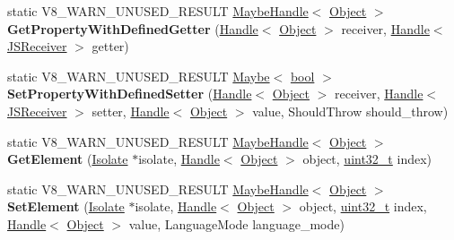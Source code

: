 \begin{DoxyCompactItemize}
\item 
\mbox{\label{classv8_1_1internal_1_1Object_a60e3ff2136485ae51459dee807c848ff}} 
static V8\+\_\+\+W\+A\+R\+N\+\_\+\+U\+N\+U\+S\+E\+D\+\_\+\+R\+E\+S\+U\+LT \mbox{\hyperlink{classv8_1_1internal_1_1MaybeHandle}{Maybe\+Handle}}$<$ \mbox{\hyperlink{classv8_1_1internal_1_1Object}{Object}} $>$ {\bfseries Get\+Property\+With\+Defined\+Getter} (\mbox{\hyperlink{classv8_1_1internal_1_1Handle}{Handle}}$<$ \mbox{\hyperlink{classv8_1_1internal_1_1Object}{Object}} $>$ receiver, \mbox{\hyperlink{classv8_1_1internal_1_1Handle}{Handle}}$<$ \mbox{\hyperlink{classv8_1_1internal_1_1JSReceiver}{J\+S\+Receiver}} $>$ getter)
\item 
\mbox{\label{classv8_1_1internal_1_1Object_a22a70157b9eac8378561666c1ecbb04e}} 
static V8\+\_\+\+W\+A\+R\+N\+\_\+\+U\+N\+U\+S\+E\+D\+\_\+\+R\+E\+S\+U\+LT \mbox{\hyperlink{classv8_1_1Maybe}{Maybe}}$<$ \mbox{\hyperlink{classbool}{bool}} $>$ {\bfseries Set\+Property\+With\+Defined\+Setter} (\mbox{\hyperlink{classv8_1_1internal_1_1Handle}{Handle}}$<$ \mbox{\hyperlink{classv8_1_1internal_1_1Object}{Object}} $>$ receiver, \mbox{\hyperlink{classv8_1_1internal_1_1Handle}{Handle}}$<$ \mbox{\hyperlink{classv8_1_1internal_1_1JSReceiver}{J\+S\+Receiver}} $>$ setter, \mbox{\hyperlink{classv8_1_1internal_1_1Handle}{Handle}}$<$ \mbox{\hyperlink{classv8_1_1internal_1_1Object}{Object}} $>$ value, Should\+Throw should\+\_\+throw)
\item 
\mbox{\label{classv8_1_1internal_1_1Object_a38d82e0f9c0c94096d6524b34844dc1a}} 
static V8\+\_\+\+W\+A\+R\+N\+\_\+\+U\+N\+U\+S\+E\+D\+\_\+\+R\+E\+S\+U\+LT \mbox{\hyperlink{classv8_1_1internal_1_1MaybeHandle}{Maybe\+Handle}}$<$ \mbox{\hyperlink{classv8_1_1internal_1_1Object}{Object}} $>$ {\bfseries Get\+Element} (\mbox{\hyperlink{classv8_1_1internal_1_1Isolate}{Isolate}} $\ast$isolate, \mbox{\hyperlink{classv8_1_1internal_1_1Handle}{Handle}}$<$ \mbox{\hyperlink{classv8_1_1internal_1_1Object}{Object}} $>$ object, \mbox{\hyperlink{classuint32__t}{uint32\+\_\+t}} index)
\item 
\mbox{\label{classv8_1_1internal_1_1Object_a23dd55843639ed7fd2aff0a62ce15e39}} 
static V8\+\_\+\+W\+A\+R\+N\+\_\+\+U\+N\+U\+S\+E\+D\+\_\+\+R\+E\+S\+U\+LT \mbox{\hyperlink{classv8_1_1internal_1_1MaybeHandle}{Maybe\+Handle}}$<$ \mbox{\hyperlink{classv8_1_1internal_1_1Object}{Object}} $>$ {\bfseries Set\+Element} (\mbox{\hyperlink{classv8_1_1internal_1_1Isolate}{Isolate}} $\ast$isolate, \mbox{\hyperlink{classv8_1_1internal_1_1Handle}{Handle}}$<$ \mbox{\hyperlink{classv8_1_1internal_1_1Object}{Object}} $>$ object, \mbox{\hyperlink{classuint32__t}{uint32\+\_\+t}} index, \mbox{\hyperlink{classv8_1_1internal_1_1Handle}{Handle}}$<$ \mbox{\hyperlink{classv8_1_1internal_1_1Object}{Object}} $>$ value, Language\+Mode language\+\_\+mode)

\end{DoxyCompactItemize}
